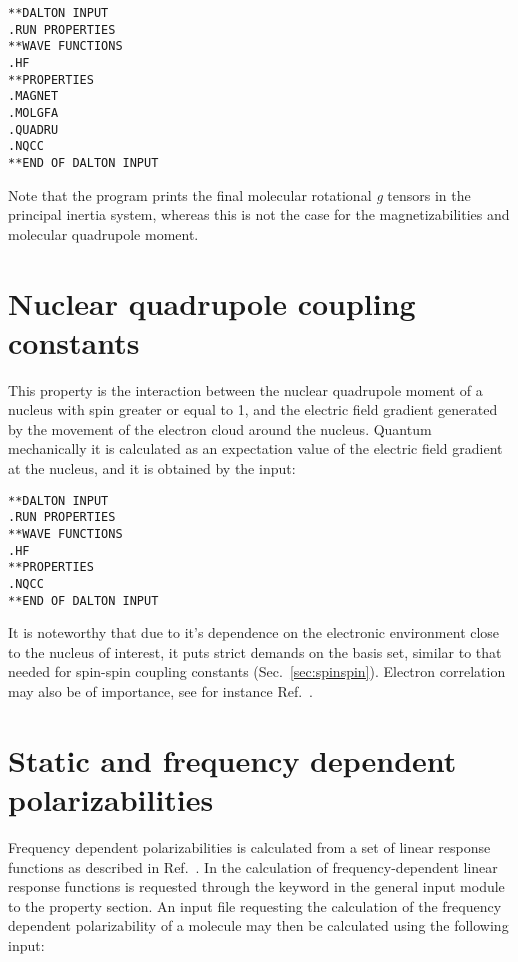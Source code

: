 \begin{verbatim}
**DALTON INPUT
.RUN PROPERTIES
**WAVE FUNCTIONS
.HF
**PROPERTIES
.MAGNET
.MOLGFA
.QUADRU
.NQCC
**END OF DALTON INPUT
\end{verbatim}

Note that the program prints the final molecular rotational {\em g}
tensors in the
principal inertia system, whereas this is not the case for the
magnetizabilities and molecular quadrupole moment.

\section{Nuclear quadrupole coupling constants}

This property is the interaction between the nuclear quadrupole moment
of a nucleus with spin greater or equal to 1, and the electric field gradient
generated by the movement of the electron cloud around the nucleus.
Quantum mechanically it is calculated as an expectation value of the electric
field gradient  at the nucleus, and it is obtained by the input:

\begin{verbatim}
**DALTON INPUT
.RUN PROPERTIES
**WAVE FUNCTIONS
.HF
**PROPERTIES
.NQCC
**END OF DALTON INPUT
\end{verbatim}

It is noteworthy that due to it's dependence on the
electronic environment close to the nucleus of interest, it puts strict
demands on the basis set, similar to that needed for spin-spin
coupling
constants (Sec.~\ref{sec:spinspin}). Electron correlation may also be of
importance, see for instance Ref.~\cite{mjssocpjthkrcpl243}.

\section{Static and frequency dependent
polarizabilities}\label{sec:polari}

Frequency dependent polarizabilities is
calculated from a set of linear
response functions as
described in Ref.~\cite{jopjjcp82}. In {\aba} the
calculation of frequency-dependent linear response functions is
requested through the keyword  in the general input
module to the property section. An input file requesting the calculation of the frequency 
dependent polarizability of a molecule may then be calculated using
the following input:

